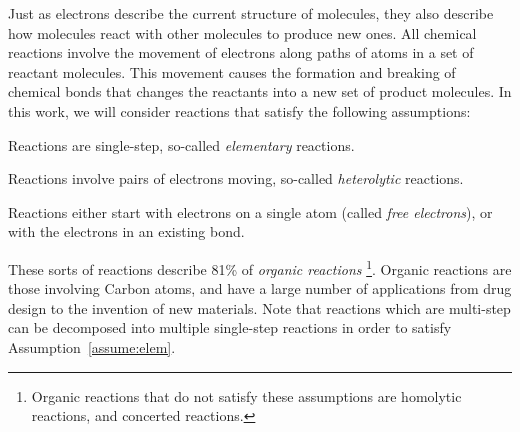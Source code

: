 Just as electrons describe the current structure of molecules, they also describe how molecules react with other molecules to produce new ones. 
All chemical reactions involve the movement of electrons along paths of atoms in a set of reactant molecules. 
This movement causes the formation and breaking of chemical bonds that changes the reactants into a new set of product molecules. 
In this work, we will consider reactions that satisfy the following assumptions:
\begin{assumption}
Reactions are single-step, so-called \emph{elementary} reactions.
\label{assume:elem}
\end{assumption}

\begin{assumption}
Reactions involve pairs of electrons moving, so-called \emph{heterolytic} reactions.
\label{assume:het}
\end{assumption}

\begin{assumption}
Reactions either start with electrons on a single atom (called \emph{free electrons}), or with the electrons in an existing bond.
\label{assume:atom_bond}
\end{assumption}

These sorts of reactions describe 81\% of \emph{organic reactions}\cite{herges1994coarctate} \footnote{Organic reactions that do not satisfy these assumptions are homolytic reactions, and concerted reactions.}.
Organic reactions are those involving Carbon atoms, and have a large number of applications from drug design to the invention of new materials\cite{segler2018planning}.
Note that reactions which are multi-step can be decomposed into multiple single-step reactions in order to satisfy Assumption~\ref{assume:elem}.

